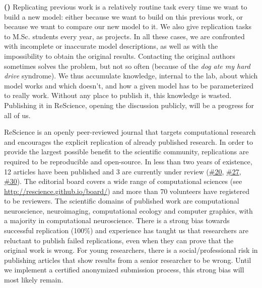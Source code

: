 \documentclass[a4paper,10pt, twocolumn]{article}
\begin{document}
\begin{tcolorbox}[breakable, pad at break*=1mm,
                  colback=black!2.5, arc=0pt, outer arc=0pt, boxrule=.25pt]
\begin{footnotesize}
\textbf{(\cite{viejo:2016})} Replicating previous work is a relatively routine
task every time we want to build a new model: either because we want to build
on this previous work, or because we want to compare our new model to it. We also give replication tasks to
M.Sc. students every year, as projects. In all these cases, we are confronted
with incomplete or inaccurate model descriptions, as well as with the impossibility
to obtain the original results. Contacting the original authors sometimes
solves the problem, but not so often (because of the {\em dog ate my hard
  drive} syndrome). We thus accumulate knowledge, internal to the lab, about
which model works and which doesn't, and how a given model has to be parameterized
to really work. Without any place to publish it, this knowledge is
wasted. Publishing it in ReScience, opening the discussion publicly, will be a
progress for all of us. \par
\end{footnotesize}
\end{tcolorbox}

ReScience is an openly peer-reviewed journal that targets computational research
and encourages the explicit replication of already published research. In order
to provide the largest possible benefit to the scientific community, replications are
required to be reproducible and open-source. In less than two years of existence, 12
articles have been published and 3 are currently under review
(\href{https://github.com/ReScience/ReScience-submission/pull/20}{\#20},
\href{https://github.com/ReScience/ReScience-submission/pull/27}{\#27},
\href{https://github.com/ReScience/ReScience-submission/pull/30}{\#30}). The
editorial board covers a wide range of computational sciences (see
\url{http://rescience.github.io/board/}) and more than 70 volunteers have registered to be reviewers. The scientific domains of published work
are computational neuroscience, neuroimaging, computational ecology and
computer graphics, with a majority in computational neuroscience. There is a
strong bias towards successful replication (100\%) and experience has
taught us that researchers are reluctant to publish failed replications, even when they can prove that the original work is wrong. For young researchers,
there is a social/professional risk in publishing articles that show
results from a senior researcher to be wrong. Until we implement a
certified anonymized submission process, this strong bias will most likely
remain.\\
\end{document}
